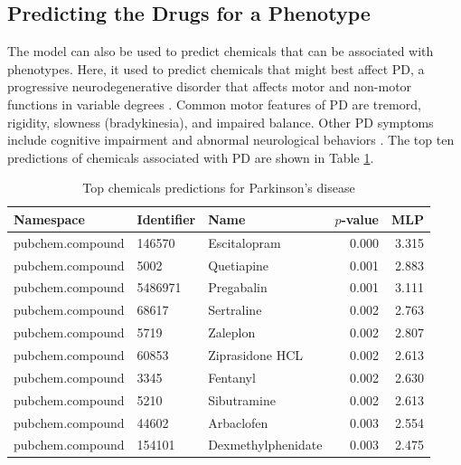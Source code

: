 \subsection{Predicting the Drugs for a Phenotype}
The model can also be used to predict chemicals that can be associated with phenotypes.
Here, it used to predict chemicals that might best affect \ac{PD}, a progressive neurodegenerative disorder that affects motor and non-motor functions in variable degrees \cite{jankovic_parkinsons_2008}.
Common motor features of \ac{PD} are tremord, rigidity, slowness (bradykinesia), and impaired balance.
Other \ac{PD} symptoms include cognitive impairment and abnormal neurological behaviors \cite{jankovic_parkinsons_2008}.
The top ten predictions of chemicals associated with \ac{PD} are shown in Table \ref{tab:phenotype_drug}.

\begin{table}[h]
    \centering
    \begin{tabular}{|l|l|l|r|r|}
        \hline
        \textbf{Namespace} & \textbf{Identifier} & \textbf{Name} & \textbf{$p$-value} & \textbf{MLP} \\
        \hline
        pubchem.compound &  146570 &  Escitalopram &  0.000 &  3.315 \\
        \hline
        pubchem.compound & 5002 &  Quetiapine &  0.001 &  2.883 \\
        \hline
        pubchem.compound &  5486971 &  Pregabalin &  0.001 &  3.111 \\
        \hline
        pubchem.compound & 68617 &  Sertraline &  0.002 &  2.763 \\
        \hline
        pubchem.compound &  5719 &  Zaleplon &  0.002 &  2.807 \\
        \hline
        pubchem.compound & 60853 & Ziprasidone HCL &  0.002 &  2.613 \\
        \hline
        pubchem.compound & 3345 & Fentanyl &  0.002 &  2.630 \\
        \hline
        pubchem.compound & 5210 & Sibutramine &  0.002 &  2.613 \\
        \hline
        pubchem.compound & 44602 &  Arbaclofen &  0.003 &  2.554 \\
        \hline
        pubchem.compound & 154101 & Dexmethylphenidate &  0.003 &  2.475 \\
        \hline
    \end{tabular}
    \caption{Top chemicals predictions for Parkinson's disease}
    \label{tab:phenotype_drug}
\end{table}

